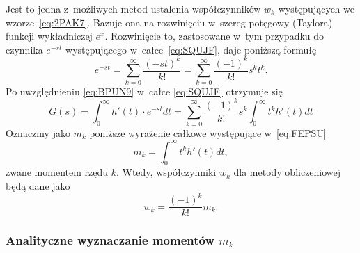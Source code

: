 \documentclass[paper=a4,DIV=12]{lpas}
\begin{document}
\begin{appendices}
  Jest to jedna z~możliwych metod ustalenia współczynników $w_k$ występujących
  we wzorze~\eqref{eq:2PAK7}. Bazuje ona na rozwinięciu w~szereg potęgowy
  (Taylora) funkcji wykładniczej $e^x$. Rozwinięcie to, zastosowane w~tym
  przypadku do czynnika $e^{-st}$ występującego w~całce~\eqref{eq:SQUJF},
  daje poniższą formułę
  \begin{equation}
    e^{-st} = \sum_{k=0}^{\infty}{\frac{(-st)^k}{k!}}
            = \sum_{k=0}^{\infty}{\frac{(-1)^k}{k!} s^k t^k }.
    \label{eq:BPUN9}
  \end{equation}
  Po uwzględnieniu \eqref{eq:BPUN9} w~całce \eqref{eq:SQUJF} otrzymuje się
  \begin{equation}
    G(s) = \int_0^{\infty}{h'(t) \cdot e^{-s t} dt}
    = \sum_{k=0}^{\infty}{\frac{(-1)^k}{k!}s^k \int_0^{\infty}{t^k h'(t) dt}}
    \label{eq:FEPSU}
  \end{equation}
  Oznaczmy jako $m_k$ poniższe wyrażenie całkowe występujące w~\eqref{eq:FEPSU}
  \begin{equation}
    m_k = \int_0^{\infty}{t^k h'(t) dt},
    \label{eq:6658Y}
  \end{equation}
  zwane momentem rzędu $k$. Wtedy, współczynniki $w_k$ dla metody obliczeniowej
  będą dane jako
  \begin{equation}
    w_k = \frac{(-1)^k}{k!} m_k.
    \label{eq:W0DJC}
  \end{equation}

  \subsubsection{Analityczne wyznaczanie momentów \texorpdfstring{$m_k$}{mk}}


\end{appendices}
\end{document}
